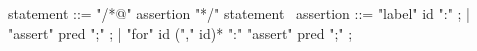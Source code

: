 \begin{syntax}
  statement ::= "/*@" assertion "*/" statement \
  assertion ::= "label" id ":" ;
  | "assert" pred ";" ;
  | "for" id ("," id)* ":" "assert" pred ";" ;
\end{syntax}

